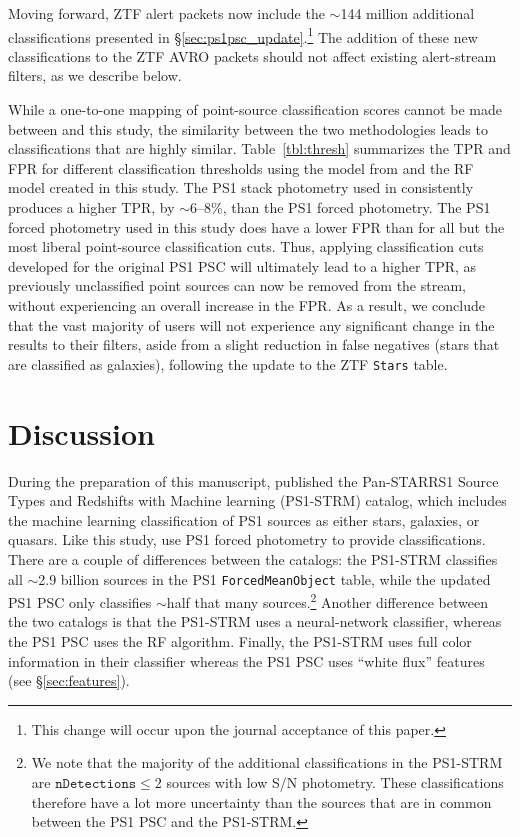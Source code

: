 \documentclass[twocolumn]{aastex63}
\begin{document}
Moving forward, ZTF alert packets now include the $\sim$144 million additional
classifications presented in \S\ref{sec:ps1psc_update}.\footnote{This change
will occur upon the journal acceptance of this paper.} The addition of these
new classifications to the ZTF AVRO packets should not affect existing
alert-stream filters, as we describe below.



While a one-to-one mapping of point-source classification scores cannot be
made between \citet{Tachibana18} and this study, the similarity between the
two methodologies leads to classifications that are highly similar.
Table~\ref{tbl:thresh} summarizes the TPR and FPR for different classification
thresholds using the model from \citet{Tachibana18} and the RF model created
in this study. The PS1 stack photometry used in \citet{Tachibana18}
consistently produces a higher TPR, by $\sim$6--8\%, than the PS1 forced
photometry. The PS1 forced photometry used in this study does have a lower FPR
than \citet{Tachibana18} for all but the most liberal point-source
classification cuts. Thus, applying classification cuts developed for the
original PS1 PSC will ultimately lead to a higher TPR, as previously
unclassified point sources can now be removed from the stream, without
experiencing an overall increase in the FPR. As a result, we conclude that the
vast majority of users will not experience any significant change in the
results to their filters, aside from a slight reduction in false negatives
(stars that are classified as galaxies), following the update to the ZTF
\texttt{Stars} table.

\section{Discussion}\label{sec:discussion}

During the preparation of this manuscript, \citet{Beck20} published the
Pan-STARRS1 Source Types and Redshifts with Machine learning (PS1-STRM)
catalog, which includes the machine learning classification of PS1 sources as
either stars, galaxies, or quasars. Like this study, \citet{Beck20} use PS1
forced photometry to provide classifications. There are a couple of
differences between the catalogs: the PS1-STRM classifies all $\sim$2.9
billion sources in the PS1 \texttt{ForcedMeanObject} table, while the updated
PS1 PSC only classifies $\sim$half that many sources.\footnote{We note that
the majority of the additional classifications in the PS1-STRM are
$\mathtt{nDetections} \le 2$ sources with low S/N photometry. These
classifications therefore have a lot more uncertainty than the sources that
are in common between the PS1 PSC and the PS1-STRM.} Another difference
between the two catalogs is that the PS1-STRM uses a neural-network
classifier, whereas the PS1 PSC uses the RF algorithm. Finally, the PS1-STRM
uses full color information in their classifier whereas the PS1 PSC uses
``white flux'' features (see \S\ref{sec:features}).
\end{document}
